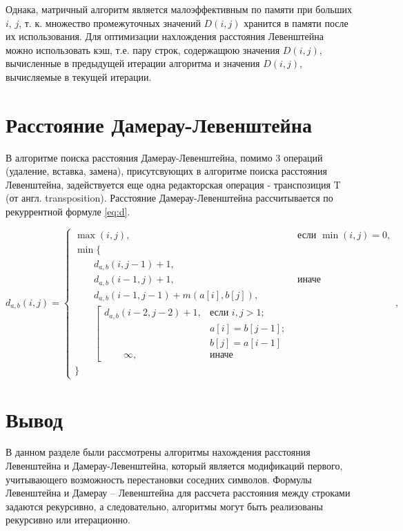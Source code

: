 Однака, матричный алгоритм является малоэффективным по памяти при больших $i$, $j$, т. к. множество промежуточных значений $D(i, j)$ хранится в памяти после их использования. Для оптимизации нахлождения расстояния Левенштейна можно использовать кэш, т.е. пару строк, содержащюю значения $D(i, j)$, вычисленные в предыдущей итерации алгоритма и значения $D(i, j)$, вычисляемые в текущей итерации.

\section{Расстояние Дамерау-Левенштейна}

В алгоритме поиска расстояния Дамерау-Левенштейна, помимо 3 операций (удаление, вставка, замена), присутсвующих в алгоритме поиска расстояния Левенштейна, задействуется еще одна редакторская операция - транспозиция T (от англ. transposition). Расстояние Дамерау-Левенштейна рассчитывается по рекуррентной формуле \ref{eq:d}.

\begin{equation}
	\label{eq:d}
	d_{a,b}(i, j) = \begin{cases}
		\max(i, j), &\text{если }\min(i, j) = 0,\\
		\min \lbrace \\
			\qquad d_{a,b}(i, j-1) + 1,\\
			\qquad d_{a,b}(i-1, j) + 1, &\text{иначе}\\
			\qquad d_{a,b}(i-1, j-1) + m(a[i], b[j]),\\
			\qquad \left[ \begin{array}{cc}d_{a,b}(i-2, j-2) + 1, &\text{если }i,j > 1;\\
			\qquad &\text{}a[i] = b[j-1]; \\
			\qquad &\text{}b[j] = a[i-1]\\
			\qquad \infty, & \text{иначе}\end{array}\right.\\
		\rbrace
		\end{cases},
\end{equation}

\section{Вывод}

В данном разделе были рассмотрены алгоритмы нахождения расстояния Левенштейна и Дамерау-Левенштейна, который является модификаций первого, учитывающего возможность перестановки соседних символов. Формулы Левенштейна и Дамерау -- Левенштейна для рассчета расстояния между строками задаются рекурсивно, а следовательно, алгоритмы могут быть реализованы рекурсивно или итерационно.

